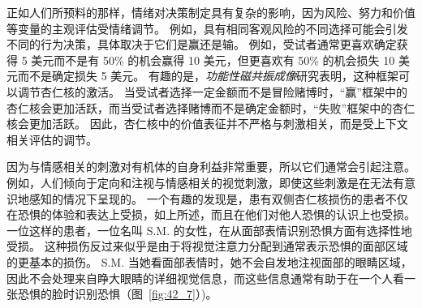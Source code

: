 正如人们所预料的那样，情绪对决策制定具有复杂的影响，因为风险、努力和价值等变量的主观评估受情绪调节。
例如，具有相同客观风险的不同选择可能会引发不同的行为决策，具体取决于它们是赢还是输。
例如，受试者通常更喜欢确定获得 5 美元而不是有 50\% 的机会赢得 10 美元，但更喜欢有 50\% 的机会损失 10 美元而不是确定损失 5 美元。
有趣的是，\textit{功能性磁共振成像}研究表明，这种框架可以调节杏仁核的激活。
当受试者选择一定金额而不是冒险赌博时，“赢”框架中的杏仁核会更加活跃，而当受试者选择赌博而不是确定金额时，“失败”框架中的杏仁核会更加活跃。
因此，杏仁核中的价值表征并不严格与刺激相关，而是受上下文相关评估的调节。


因为与情感相关的刺激对有机体的自身利益非常重要，所以它们通常会引起注意。
例如，人们倾向于定向和注视与情感相关的视觉刺激，即使这些刺激是在无法有意识地感知的情况下呈现的。
一个有趣的发现是，患有双侧杏仁核损伤的患者不仅在恐惧的体验和表达上受损，如上所述，而且在他们对他人恐惧的认识上也受损。
一位这样的患者，一位名叫 S.M. 的女性，在从面部表情识别恐惧方面有选择性地受损。
这种损伤反过来似乎是由于将视觉注意力分配到通常表示恐惧的面部区域的更基本的损伤。
S.M. 当她看面部表情时，她不会自发地注视面部的眼睛区域，因此不会处理来自睁大眼睛的详细视觉信息，而这些信息通常有助于在一个人看一张恐惧的脸时识别恐惧（图~\ref{fig:42_7}）)。


